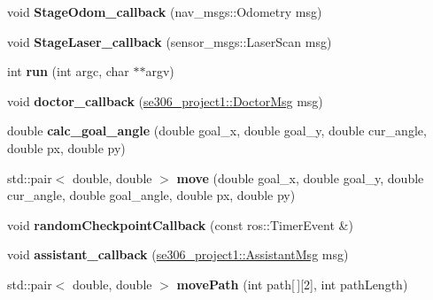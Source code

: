 \begin{DoxyCompactItemize}
\item 
\hypertarget{classResident_ae1406a27c978147c7816e57f9ed13aed}{void {\bfseries Stage\-Odom\-\_\-callback} (nav\-\_\-msgs\-::\-Odometry msg)}\label{classResident_ae1406a27c978147c7816e57f9ed13aed}

\item 
\hypertarget{classResident_a6745ec218b7e451eb7ba2ca88fa2aca9}{void {\bfseries Stage\-Laser\-\_\-callback} (sensor\-\_\-msgs\-::\-Laser\-Scan msg)}\label{classResident_a6745ec218b7e451eb7ba2ca88fa2aca9}

\item 
\hypertarget{classResident_aa4cbafa8f6cf586b53a774a8f1d81aa6}{int {\bfseries run} (int argc, char $\ast$$\ast$argv)}\label{classResident_aa4cbafa8f6cf586b53a774a8f1d81aa6}

\item 
\hypertarget{classResident_a6d8fbbc8a60508ec913fb41d7e743094}{void {\bfseries doctor\-\_\-callback} (\hyperlink{structse306__project1_1_1DoctorMsg__}{se306\-\_\-project1\-::\-Doctor\-Msg} msg)}\label{classResident_a6d8fbbc8a60508ec913fb41d7e743094}

\item 
\hypertarget{classResident_ae8e00862499c8a502b5c99f8267d3345}{double {\bfseries calc\-\_\-goal\-\_\-angle} (double goal\-\_\-x, double goal\-\_\-y, double cur\-\_\-angle, double px, double py)}\label{classResident_ae8e00862499c8a502b5c99f8267d3345}

\item 
\hypertarget{classResident_a6f48fd57a638a2b4599777a1be766296}{std\-::pair$<$ double, double $>$ {\bfseries move} (double goal\-\_\-x, double goal\-\_\-y, double cur\-\_\-angle, double goal\-\_\-angle, double px, double py)}\label{classResident_a6f48fd57a638a2b4599777a1be766296}

\item 
\hypertarget{classResident_a538db1d9cce0d967a78e7d10876d76ca}{void {\bfseries random\-Checkpoint\-Callback} (const ros\-::\-Timer\-Event \&)}\label{classResident_a538db1d9cce0d967a78e7d10876d76ca}

\item 
\hypertarget{classResident_aa715d491e917de6f621593f0d1f01bd6}{void {\bfseries assistant\-\_\-callback} (\hyperlink{structse306__project1_1_1AssistantMsg__}{se306\-\_\-project1\-::\-Assistant\-Msg} msg)}\label{classResident_aa715d491e917de6f621593f0d1f01bd6}

\item 
\hypertarget{classResident_a0cfe1d9b185beed7d3438157cc69db05}{std\-::pair$<$ double, double $>$ {\bfseries move\-Path} (int path\mbox{[}$\,$\mbox{]}\mbox{[}2\mbox{]}, int path\-Length)}\label{classResident_a0cfe1d9b185beed7d3438157cc69db05}

\end{DoxyCompactItemize}
